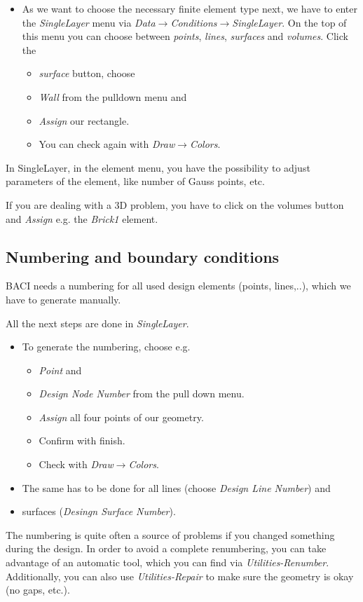\begin{itemize}
\item As we want to choose the necessary finite element type next, we have
to enter the \emph{SingleLayer} menu via \emph{Data$\to$Conditions$\to$SingleLayer}.
On the top of this menu you can choose between \emph{points}, \emph{lines},
\emph{surfaces} and \emph{volumes}. Click the 

\begin{itemize}
\item \emph{surface} button, choose 
\item \emph{Wall} from the pulldown menu and 
\item \emph{Assign} our rectangle. 
\item You can check again with \emph{Draw$\to$Colors}.
\end{itemize}
\end{itemize}
In SingleLayer, in the element menu, you have the possibility to adjust
parameters of the element, like number of Gauss points, etc.

If you are dealing with a 3D problem, you have to click on the volumes
button and \emph{Assign} e.g. the \emph{Brick1} element.


\subsection{Numbering and boundary conditions}

BACI needs a numbering for all used design elements (points, lines,..),
which we have to generate manually.

All the next steps are done in \emph{SingleLayer}.

\begin{itemize}
\item To generate the numbering, choose e.g. 

\begin{itemize}
\item \emph{Point} and 
\item \emph{Design Node Number} from the pull down menu. 
\item \emph{Assign} all four points of our geometry.
\item Confirm with finish. 
\item Check with \emph{Draw$\to$Colors}. 
\end{itemize}
\item The same has to be done for all lines (choose \emph{Design Line Number})
and 
\item surfaces (\emph{Desingn Surface Number}).
\end{itemize}
The numbering is quite often a source of problems if you changed something
during the design. In order to avoid a complete renumbering, you can
take advantage of an automatic tool, which you can find via \emph{Utilities-Renumber}.
Additionally, you can also use \emph{Utilities-Repair} to make sure
the geometry is okay (no gaps, etc.).

